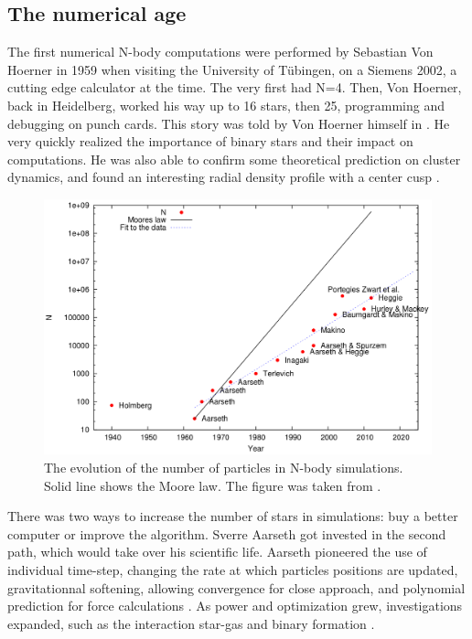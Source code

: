 \subsection*{The numerical age}

The first numerical N-body computations were performed by Sebastian Von Hoerner in 1959 when visiting the University of T\"ubingen, on a Siemens 2002, a cutting edge calculator at the time. The very first had N=4. Then, Von Hoerner, back in Heidelberg, worked his way up to 16 stars, then 25, programming and debugging on punch cards. This story was told by Von Hoerner himself in \cite{VonHoerner2001}. He very quickly realized the importance of binary stars and their impact on computations. He was also able to confirm some theoretical prediction on cluster dynamics, and found an interesting radial density profile with a center cusp \citep{VonHoerner1960,VonHoerner1963}.

\begin{figure}
\label{Fig:N_increase}
\includegraphics[width=0.9\linewidth]{Figures/0_N_increase.png}
\caption{The evolution of the number of particles in N-body simulations. Solid line shows the Moore law. The figure was taken from \protect\cite{Bedorf2012}. }
\end{figure}


There was two ways to increase the number of stars in simulations: buy a better computer or improve the algorithm. Sverre Aarseth got invested in the second path, which would take over his scientific life. Aarseth pioneered the use of individual time-step, changing the rate at which particles positions are updated, gravitationnal softening, allowing convergence for close approach, and polynomial prediction for force calculations \citep{Aarseth1964}. As power and optimization grew, investigations expanded, such as the interaction star-gas \citep{VanAlbada1968a} and binary formation \citep{VanAlbada1968b}.

